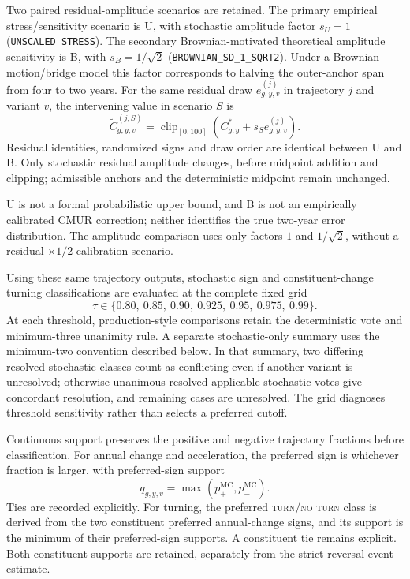 Two paired residual-amplitude scenarios are retained. The primary empirical stress/sensitivity scenario is U, with stochastic amplitude factor $s_U=1$ (\texttt{UNSCALED\_STRESS}). The secondary Brownian-motivated theoretical amplitude sensitivity is B, with $s_B=1/\sqrt{2}$ (\texttt{BROWNIAN\_SD\_1\_SQRT2}). Under a Brownian-motion/bridge model this factor corresponds to halving the outer-anchor span from four to two years. For the same residual draw $e^{(j)}_{g,y,v}$ in trajectory $j$ and variant $v$, the intervening value in scenario $S$ is
\begin{equation}
\widetilde C^{(j,S)}_{g,y,v}
=\operatorname{clip}_{[0,100]}
\left(C^\ast_{g,y}+s_S e^{(j)}_{g,y,v}\right).
\end{equation}
Residual identities, randomized signs and draw order are identical between U and B. Only stochastic residual amplitude changes, before midpoint addition and clipping; admissible anchors and the deterministic midpoint remain unchanged.

U is not a formal probabilistic upper bound, and B is not an empirically calibrated CMUR correction; neither identifies the true two-year error distribution. The amplitude comparison uses only factors $1$ and $1/\sqrt{2}$, without a residual $\times1/2$ calibration scenario.

Using these same trajectory outputs, stochastic sign and constituent-change turning classifications are evaluated at the complete fixed grid
\begin{equation}
\tau\in\{0.80,\ 0.85,\ 0.90,\ 0.925,\ 0.95,\ 0.975,\ 0.99\}.
\end{equation}
At each threshold, production-style comparisons retain the deterministic vote and minimum-three unanimity rule. A separate stochastic-only summary uses the minimum-two convention described below. In that summary, two differing resolved stochastic classes count as conflicting even if another variant is unresolved; otherwise unanimous resolved applicable stochastic votes give concordant resolution, and remaining cases are unresolved. The grid diagnoses threshold sensitivity rather than selects a preferred cutoff.

Continuous support preserves the positive and negative trajectory fractions before classification. For annual change and acceleration, the preferred sign is whichever fraction is larger, with preferred-sign support
\begin{equation}
q_{g,y,v}=\max\left(p_+^{\mathrm{MC}},p_-^{\mathrm{MC}}\right).
\end{equation}
Ties are recorded explicitly. For turning, the preferred \textsc{turn}/\textsc{no turn} class is derived from the two constituent preferred annual-change signs, and its support is the minimum of their preferred-sign supports. A constituent tie remains explicit. Both constituent supports are retained, separately from the strict reversal-event estimate.


